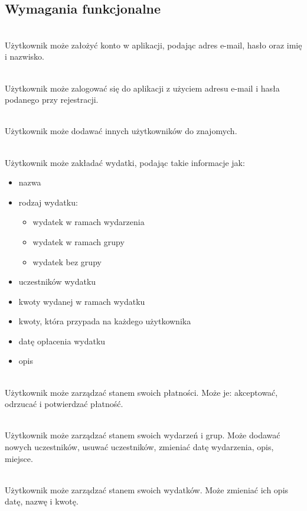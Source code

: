 \subsection{Wymagania funkcjonalne}
\begin{description}[leftmargin={15pt},labelindent={0pt}]
  \item[WF1.] \hfill \\ Użytkownik może założyć konto w aplikacji, podając adres e-mail, hasło oraz imię i nazwisko.
  \item[WF2.] \hfill \\ Użytkownik może zalogować się do aplikacji z użyciem adresu e-mail i hasła podanego przy rejestracji.
  \item[WF3.] \hfill \\ Użytkownik może dodawać innych użytkowników do znajomych.
  \item[WF4.] \hfill \\ Użytkownik może zakładać wydatki, podając takie informacje jak:
    \begin{itemize}
      \item nazwa
      \item rodzaj wydatku:
        \begin{itemize}
          \item wydatek w ramach wydarzenia
          \item wydatek w ramach grupy
          \item wydatek bez grupy
        \end{itemize}
      \item uczestników wydatku
      \item kwoty wydanej w ramach wydatku
      \item kwoty, która przypada na każdego użytkownika
      \item datę opłacenia wydatku
      \item opis
    \end{itemize}
  \item[WF5.] \hfill \\ Użytkownik może zarządzać stanem swoich płatności. Może je: akceptować, odrzucać i potwierdzać płatność.
  \item[WF6.] \hfill \\ Użytkownik może zarządzać stanem swoich wydarzeń i grup. Może dodawać nowych uczestników, usuwać uczestników, zmieniać datę wydarzenia, opis, miejsce.
  \item[WF7.] \hfill \\ Użytkownik może zarządzać stanem swoich wydatków. Może zmieniać ich opis datę, nazwę i kwotę.

\end{description}
